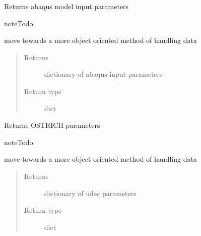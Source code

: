 \documentclass[letterpaper,10pt,english]{sphinxmanual}
\begin{document}
\begin{fulllineitems}
\begin{fulllineitems}
\label{\detokenize{MouseReferenceManual:Modules.Module_OSTRICH.Module_OSTRICH.getModelParameters}}
Returns abaqus model input parameters

\begin{sphinxadmonition}{note}{Todo}

move towards a  more object oriented method of handling data
\end{sphinxadmonition}
\begin{quote}\begin{description}
\item[{Returns}] \leavevmode
dictionary of abaqus input parameters

\item[{Return type}] \leavevmode
dict

\end{description}\end{quote}

\end{fulllineitems}


\begin{fulllineitems}
\label{\detokenize{MouseReferenceManual:Modules.Module_OSTRICH.Module_OSTRICH.getOstrichParameters}}
Returns OSTRICH parameters

\begin{sphinxadmonition}{note}{Todo}

move towards a  more object oriented method of handling data
\end{sphinxadmonition}
\begin{quote}\begin{description}
\item[{Returns}] \leavevmode
dictionary of udec parameters

\item[{Return type}] \leavevmode
dict

\end{description}\end{quote}

\end{fulllineitems}



\end{fulllineitems}
\end{document}
